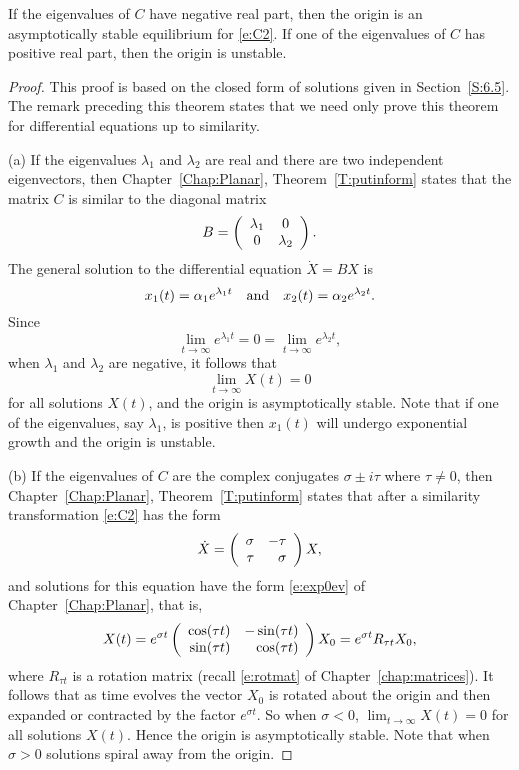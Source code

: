 \documentclass{ximera}
\begin{document}
\begin{theorem}  \label{C:asympstlin}
If the eigenvalues of $C$ have negative real part, then the origin
is an asymptotically stable equilibrium for \eqref{e:C2}.
If one of the
eigenvalues of $C$ has positive real part, then the origin is unstable.
\end{theorem}

\begin{proof}  This proof is based on the closed form of solutions given in
Section~\ref{S:6.5}.   The remark preceding this theorem states that we
need only prove this theorem for differential equations up to similarity.

\noindent (a) \quad If the eigenvalues $\lambda_1$ and $\lambda_2$ are real
and there are two independent eigenvectors, then Chapter~\ref{Chap:Planar},
Theorem~\ref{T:putinform} states that the matrix $C$ is similar to the
diagonal matrix
\[
B = \left(\begin{array}{cc} \lambda_1 & 0\\ 0 &\lambda_2\end{array}\right).
\]
The general solution to the differential equation $\dot{X}=BX$ is
\[
x_1(t) = \alpha_1e^{\lambda_1 t} \quad\mbox{and}\quad x_2(t) = \alpha_2e^{\lambda_2 t}.
\]
Since
\[
\lim_{t\to\infty}e^{\lambda_1 t} = 0  = \lim_{t\to\infty}e^{\lambda_2 t},
\]
when $\lambda_1$ and $\lambda_2$ are negative, it follows that
\[
\lim_{t\to\infty} X(t) = 0
\]
for all solutions $X(t)$, and the origin is asymptotically stable.  Note that
if one of the eigenvalues, say $\lambda_1$, is positive then $x_1(t)$ will
undergo exponential growth and the origin is unstable.

\noindent (b) \quad If the eigenvalues of $C$ are the complex conjugates
$\sigma\pm i\tau$ where $\tau\neq 0$, then Chapter~\ref{Chap:Planar},
Theorem~\ref{T:putinform} states that after a similarity transformation
\eqref{e:C2} has the form
\[
\dot{X} = \left(\begin{array}{rr} \sigma & -\tau\\ \tau &\sigma\end{array}\right)X,
\]
and solutions for this equation have the form \eqref{e:exp0ev} of
Chapter~\ref{Chap:Planar}, that is,
\[
X(t) = e^{\sigma t}
\left(\begin{array}{rr} \cos(\tau t) & -\sin(\tau t)\\ \sin(\tau t) &\cos(\tau t)\end{array}\right)X_0
= e^{\sigma t}R_{\tau t}X_0,
\]
where $R_{\tau t}$ is a rotation matrix
(recall \eqref{e:rotmat} of
Chapter~\ref{chap:matrices}).  It follows that as time evolves
the vector $X_0$ is rotated about the origin and then expanded or contracted
by the factor $e^{\sigma t}$.  So when $\sigma<0$, $\lim_{t\to\infty} X(t)=0$
for all solutions $X(t)$.  Hence the origin is asymptotically stable.  Note
that when $\sigma>0$ solutions spiral away from the origin.


\end{proof}
\end{document}

